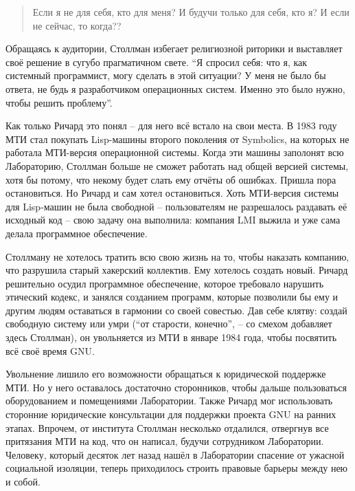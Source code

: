 \begin{quote}
Если я не для себя, кто для меня? И будучи только для себя, кто я? И если не сейчас, то когда??
\end{quote}

Обращаясь к аудитории, Столлман избегает религиозной риторики и выставляет своё решение в сугубо прагматичном свете. \enquote{Я спросил себя: что я, как системный программист, могу сделать в этой ситуации? У меня не было бы ответа, не будь я разработчиком операционных систем. Именно это было нужно, чтобы решить проблему}.

Как только Ричард это понял -- для него всё встало на свои места. В 1983 году МТИ стал покупать Lisp-машины второго поколения от Symbolics, на которых не работала МТИ-версия операционной системы. Когда эти машины заполонят всю Лабораторию, Столлман больше не сможет работать над общей версией системы, хотя бы потому, что некому будет слать ему отчёты об ошибках. Пришла пора остановиться. Но Ричард и сам хотел остановиться. Хоть МТИ-версия системы для Lisp-машин не была свободной -- пользователям не разрешалось раздавать её исходный код -- свою задачу она выполнила: компания LMI выжила и уже сама делала программное обеспечение.

Столлману не хотелось тратить всю свою жизнь на то, чтобы наказать компанию, что разрушила старый хакерский коллектив. Ему хотелось создать новый. Ричард решительно осудил программное обеспечение, которое требовало нарушить этический кодекс, и занялся созданием программ, которые позволили бы ему и другим людям оставаться в гармонии со своей совестью. Дав себе клятву: создай свободную систему или умри (\enquote{от старости, конечно}, -- со смехом добавляет здесь Столлман), он увольняется из МТИ в январе 1984 года, чтобы посвятить всё своё время GNU.

Увольнение лишило его возможности обращаться к юридической поддержке МТИ. Но у него оставалось достаточно сторонников, чтобы дальше пользоваться оборудованием и помещениями Лаборатории. Также Ричард мог использовать сторонние юридические консультации для поддержки проекта GNU на ранних этапах. Впрочем, от института Столлман несколько отдалился, отвергнув все притязания МТИ на код, что он написал, будучи сотрудником Лаборатории. Человеку, который десяток лет назад нашёл в Лаборатории спасение от ужасной социальной изоляции, теперь приходилось строить правовые барьеры между нею и собой.

